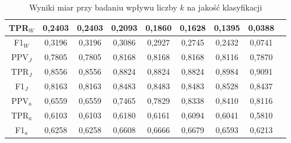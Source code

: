 \documentclass{article}
\begin{document}
\begin{table}[h!]
\begin{tabular}{|c|c|c|c|c|c|c|c|c|}
    TPR\(_W\) & 0,2403 & 0,2403 & 0,2093 & 0,1860& 0,1628& 0,1395& 0,0388\\ \hline
    F1\(_W\) & 0,3196 & 0,3196 & 0,3086 & 0,2927& 0,2745& 0,2432& 0,0741\\ \hline
    PPV\(_J\) & 0,7805 & 0,7805 & 0,8168 & 0,8168& 0,8168& 0,8116& 0,7870\\ \hline
    TPR\(_J\) & 0,8556 & 0,8556 & 0,8824 &  0,8824& 0,8824& 0,8984& 0,9091\\ \hline
    F1\(_J\) & 0,8163 & 0,8163 & 0,8483 &  0,8483& 0,8483& 0,8528& 0,8437\\ \hline
    PPV\(_a\) & 0,6559 & 0,6559 & 0,7465 & 0,7829 & 0,8338 & 0,8410 & 0,8116\\ \hline
    TPR\(_a\) & 0,6103 & 0,6103 & 0,6180 & 0,6161 & 0,6094 & 0,6041 & 0,5810\\ \hline
    F1\(_a\) & 0,6258 & 0,6258 & 0,6608 & 0,6666 & 0,6679 & 0,6593 & 0,6213\\ \hline
    \end{tabular}
    \caption{Wyniki miar przy badaniu wpływu liczby \(k\) na jakość klasyfikacji}
\end{table}
\end{document}
